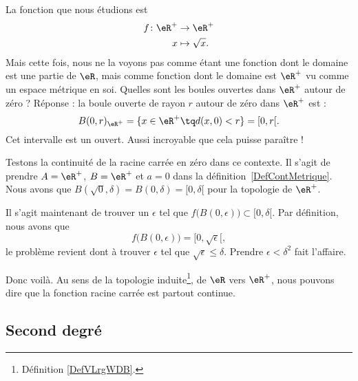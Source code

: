 La fonction que nous étudions est
\begin{equation}
	\begin{aligned}
		f \colon \eR^+ & \to \eR^+         \\
		x              & \mapsto \sqrt{x}.
	\end{aligned}
\end{equation}
Mais cette fois, nous ne la voyons pas comme étant une fonction dont le domaine est une partie de $\eR$, mais comme fonction dont le domaine est $\eR^+$ vu comme un espace métrique en soi. Quelles sont les boules ouvertes dans $\eR^+$ autour de zéro ? Réponse : la boule ouverte de rayon $r$ autour de zéro dans $\eR^+$ est :
\[
	B(0,r)_{\eR^+}=\{ x\in\eR^+\tq d(x,0)<r \}=[0,r[.
\]
Cet intervalle est un ouvert. Aussi incroyable que cela puisse paraître !

Testons la continuité de la racine carrée en zéro dans ce contexte. Il s'agit de prendre $A=\eR^+$, $B=\eR^+$ et $a=0$ dans la définition~\ref{DefContMetrique}. Nous avons que $B(\sqrt{0},\delta)=B(0,\delta)=[0,\delta[$ pour la topologie de $\eR^+$.

Il s'agit maintenant de trouver un $\epsilon$ tel que $f\big( B(0,\epsilon) \big)\subset [0,\delta[$. Par définition, nous avons que
\[
	f\big( B(0,\epsilon) \big)=[0,\sqrt{\epsilon}[,
\]
le problème revient dont à trouver $\epsilon$ tel que $\sqrt{\epsilon}\leq\delta$. Prendre $\epsilon<\delta^2$ fait l'affaire.

Donc voilà. Au sens de la topologie induite\footnote{Définition \ref{DefVLrgWDB}.}, de \( \eR\) vers \( \eR^+\), nous pouvons dire que la fonction racine carrée est partout continue.

\subsection{Second degré}


